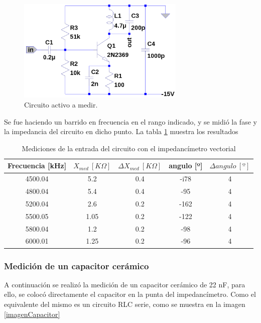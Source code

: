 \documentclass[a4paper,10pt]{article}
\begin{document}
		\begin{figure}[!htb]
			\centering
			\includegraphics[width=8cm]{Imagenes/ActiveCircuit.png}
			\caption{Circuito activo a medir.}
			\label{img006} 
		\end{figure}

		\indent Se fue haciendo un barrido en frecuencia en el rango indicado,
		y se midió la fase y la impedancia del circuito en dicho punto. La 
		tabla \ref{tabbla} muestra los resultados

		\begin{table}[!htp]
			\centering
			\begin{tabular}{|c|c|c|c|c|}
				\hline
				Frecuencia [kHz] & $X_{med}~[K\Omega]$ & 
				$\Delta X_{med}~[K\Omega]$ & angulo [º] & $\Delta angulo~[º]$ \\
				\hline
				4500.04 & 5.2 & 0.4 & -i78 & 4 \\
				\hline
				4800.04 & 5.4 & 0.4 & -95 & 4 \\ 
				\hline
				5200.04 & 2.6 & 0.2 & -162 & 4 \\
				\hline
				5500.05 & 1.05 & 0.2 & -122 & 4 \\ 
				\hline									
				5800.04 & 1.2 & 0.2 & -98 & 4 \\
				\hline
				6000.01 & 1.25 & 0.2 & -96 & 4 \\
				\hline
			\end{tabular}
			\caption{Mediciones de la entrada del circuito con el 
			impedancímetro vectorial} \label{tabbla}
		\end{table}
		
		\subsubsection{Medición de un capacitor cerámico}
		\indent A continuación se realizó la medición de un capacitor cerámico
		de 22 nF, para ello, se colocó directamente el capacitor en la punta 
		del impedancímetro. Como el equivalente del mismo es un circuito RLC 
		serie, como se muestra en la imagen \ref{imagenCapacitor} 
		
\end{document}
